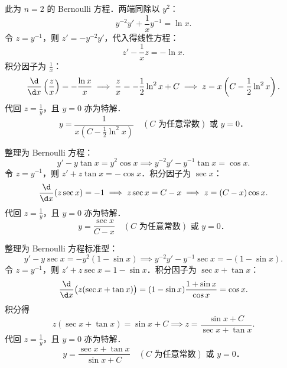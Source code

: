 \begin{solution}
    此为 $n = 2$ 的 Bernoulli 方程．两端同除以 $y^2$：
    \begin{equation}
        y^{-2}y' + \frac{1}{x}y^{-1} = \ln x.
    \end{equation}
    令 $z = y^{-1}$，则 $z' = -y^{-2}y'$，代入得线性方程：
    \begin{equation}
        z' - \frac{1}{x}z = -\ln x.
    \end{equation}
    积分因子为 $\frac{1}{x}$：
    \begin{equation}
        \frac{\d}{\d x}\left( \frac{z}{x} \right) = -\frac{\ln x}{x} \implies \frac{z}{x} = -\frac{1}{2}\ln^2 x + C \implies z = x\left(C - \frac{1}{2}\ln^2 x\right).
    \end{equation}
    代回 $z = \frac{1}{y}$，且 $y = 0$ 亦为特解．
    \begin{equation}
        \boxed{y = \frac{1}{x\left(C - \frac{1}{2}\ln^2 x\right)} \quad (C \text{ 为任意常数}) \text{ 或 } y = 0．}
    \end{equation}


    整理为 Bernoulli 方程：
    \begin{equation}
        y' - y\tan x = y^2 \cos x \implies y^{-2}y' - y^{-1}\tan x = \cos x.
    \end{equation}
    令 $z = y^{-1}$，则 $z' + z\tan x = -\cos x$．积分因子为 $\sec x$：
    \begin{equation}
        \frac{\d}{\d x}(z \sec x) = -1 \implies z\sec x = C - x \implies z = (C - x)\cos x.
    \end{equation}
    代回 $z = \frac{1}{y}$，且 $y = 0$ 亦为特解．
    \begin{equation}
        \boxed{y = \frac{\sec x}{C - x} \quad (C \text{ 为任意常数}) \text{ 或 } y = 0．}
    \end{equation}


    整理为 Bernoulli 方程标准型：
    \begin{equation}
        y' - y\sec x = -y^2(1 - \sin x) \implies y^{-2}y' - y^{-1}\sec x = -(1 - \sin x).
    \end{equation}
    令 $z = y^{-1}$，则 $z' + z\sec x = 1 - \sin x$．积分因子为 $\sec x + \tan x$：
    \begin{equation}
        \frac{\d}{\d x}\bigl(z(\sec x + \tan x)\bigr) = (1 - \sin x)\frac{1 + \sin x}{\cos x} = \cos x.
    \end{equation}
    积分得
    \begin{equation}
        z(\sec x + \tan x) = \sin x + C \implies z = \frac{\sin x + C}{\sec x + \tan x}.
    \end{equation}
    代回 $z = \frac{1}{y}$，且 $y = 0$ 亦为特解．
    \begin{equation}
        \boxed{y = \frac{\sec x + \tan x}{\sin x + C} \quad (C \text{ 为任意常数}) \text{ 或 } y = 0．}
    \end{equation}
\end{solution}

